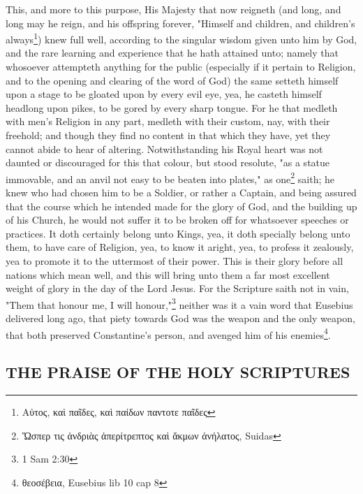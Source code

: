 This, and more to this purpose, His Majesty that now reigneth (and long, and long may he reign, and his offspring forever, "Himself and children, and children's always\footnote{\foreignlanguage{greek}{Αὐτος, καὶ παῖδες, καὶ παίδων παντοτε παῖδες}}) knew full well, according to the singular wisdom given unto him by God, and the rare learning and experience that he hath attained unto; namely that whosoever attempteth anything for the public (especially if it pertain to Religion, and to the opening and clearing of the word of God) the same setteth himself upon a stage to be gloated upon by every evil eye, yea, he casteth himself headlong upon pikes, to be gored by every sharp tongue. For he that medleth with men's Religion in any part, medleth with their custom, nay, with their freehold; and though they find no content in that which they have, yet they cannot abide to hear of altering. Notwithstanding his Royal heart was not daunted or discouraged for this that colour, but stood resolute, "as a statue immovable, and an anvil not easy to be beaten into plates," as one\footnote{\foreignlanguage{greek}{Ὥσπερ τις ἀνδριὰς ἀπερίτρεπτος καὶ ἄκμων ἀνήλατος}, Suidas} saith; he knew who had chosen him to be a Soldier, or rather a Captain, and being assured that the course which he intended made for the glory of God, and the building up of his Church, he would not suffer it to be broken off for whatsoever speeches or practices. It doth certainly belong unto Kings, yea, it doth specially belong unto them, to have care of Religion, yea, to know it aright, yea, to profess it zealously, yea to promote it to the uttermost of their power. This is their glory before all nations which mean well, and this will bring unto them a far most excellent weight of glory in the day of the Lord Jesus. For the Scripture saith not in vain, "Them that honour me, I will honour,"\footnote{1 Sam 2:30} neither was it a vain word that Eusebius delivered long ago, that piety towards God was the weapon and the only weapon, that both preserved Constantine's person, and avenged him of his enemies\footnote{\foreignlanguage{greek}{θεοσέβεια}, Eusebius lib 10 cap 8}.

\subsection{THE PRAISE OF THE HOLY SCRIPTURES}

